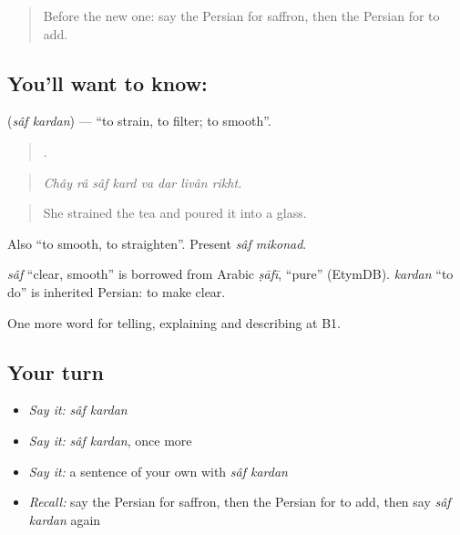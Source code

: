 \label{lesson:FA-C359-saf-kardan}



\begin{quote}
Before the new one: say the Persian for saffron, then the Persian for to add.
\end{quote}

\subsection*{You'll want to know:  }
\textbf{ } (\emph{sâf kardan}) — \textquotedblleft{}to strain, to filter; to smooth\textquotedblright{}.

\begin{quote}
       .
\end{quote}

\begin{quote}
\emph{Chây râ sâf kard va dar livân rikht.}
\end{quote}

\begin{quote}
She strained the tea and poured it into a glass.
\end{quote}

Also \textquotedblleft{}to smooth, to straighten\textquotedblright{}. Present \emph{sâf mikonad}.

\begin{cousinweb}
\emph{sâf} \textquotedblleft{}clear, smooth\textquotedblright{} is borrowed from Arabic \emph{ṣāfī}, \textquotedblleft{}pure\textquotedblright{} (EtymDB). \emph{kardan} \textquotedblleft{}to do\textquotedblright{} is inherited Persian: to make clear.
\end{cousinweb}

\begin{grammarlens}[title={What you've built}]
One more word for telling, explaining and describing at B1.
\end{grammarlens}

\subsection*{Your turn}
\begin{itemize}
\raggedright
  \item \emph{Say it:} \emph{sâf kardan}
  \item \emph{Say it:} \emph{sâf kardan}, once more
  \item \emph{Say it:} a sentence of your own with \emph{sâf kardan}
  \item \emph{Recall:} say the Persian for saffron, then the Persian for to add, then say \emph{sâf kardan} again
\end{itemize}

